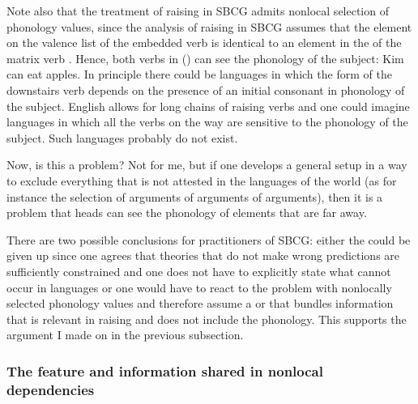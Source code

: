 Note also that the treatment of raising in SBCG admits nonlocal selection of phonology
values, since the analysis of raising in SBCG assumes that the element on the valence list of the
embedded verb is identical to an element in the \argstl of the matrix verb \citep[]{Sag2012a}. Hence, both verbs in () can see the phonology of the subject:
\ea
Kim can eat apples.
\z
In principle there could be languages in which the form of the downstairs verb depends on the
presence of an initial consonant in phonology of the subject. English allows for long chains of
raising verbs and one could imagine languages in which all the verbs on the way are sensitive to the
phonology of the subject. Such languages probably do not exist.

Now, is this a problem? Not for me, but if one develops a general setup in a
way to exclude everything that is not attested in the languages of the world (as for instance the
selection of arguments of arguments of arguments), then it is a problem that heads can see the
phonology of elements that are far away.

There are two possible conclusions for practitioners of SBCG: either the \motherf could be given up
since one agrees that theories that do not make wrong predictions are sufficiently constrained and
one does not have to explicitly state what cannot occur in languages or one would have to react to
the problem with nonlocally selected phonology values and therefore assume a \synsem or \localf that
bundles information that is relevant in raising and does not include the
phonology.
This supports the argument I made on \mother in the previous subsection.

\subsubsection{The \local feature and information shared in nonlocal dependencies}
\label{sec-local-feature-sbcg}

